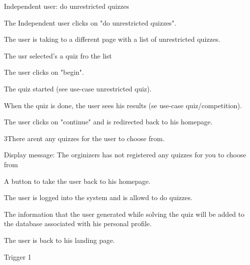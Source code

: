 \begin{uc}{Independent user: do unrestricted quizzes}

    \begin{uc-mss}
    \item The Independent user clicks on "do unrestricted quizzes".
    \item The user is taking to a different page with a list of unrestricted quizzes.
    \item The usr selected's a quiz fro the list
    \item The user clicks on "begin".
    \item The quiz started (see use-case unrestricted quiz).
    \item When the quiz is done, the user sees his results (se use-case quiz/competition).
    \item The user clicks on "continue" and is redirected back to his homepage.
    \end{uc-mss}

    \begin{uc-ext}

        \begin{uc-fail}{3}{There arent any quizzes for the user to choose from.}
        \item Display message: The orginizers has not registered any quizzes for you to choose from
        \item A button to take the user back to his homepage.
        \end{uc-fail}

    \end{uc-ext}

    \begin{uc-pre}
    \item The user is logged into the system and is allowd to do quizzes.
    \end{uc-pre}

    \begin{uc-post}
    \item The information that the user generated while solving the quiz will be added to the database associated with his personal profile.
    \item The user is back to his landing page.
    \end{uc-post}

    \begin{uc-trig}
        Trigger 1
    \end{uc-trig}

\end{uc}

